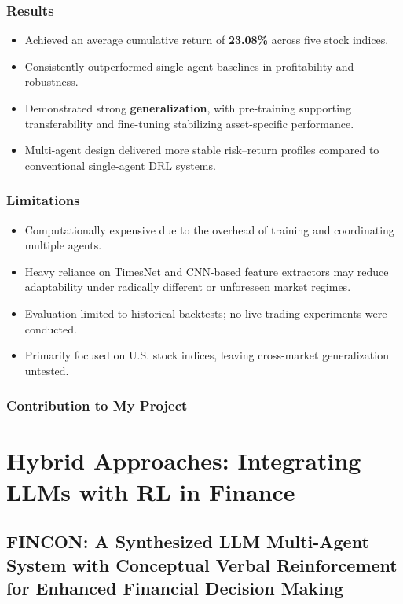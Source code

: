 \documentclass[12pt,a4paper]{report}
\begin{document}
\subsubsection{Results}
\begin{itemize}
    \item Achieved an average cumulative return of \textbf{23.08\%} across five stock indices.  
    \item Consistently outperformed single-agent baselines in profitability and robustness.  
    \item Demonstrated strong \textbf{generalization}, with pre-training supporting transferability and fine-tuning stabilizing asset-specific performance.  
    \item Multi-agent design delivered more stable risk–return profiles compared to conventional single-agent DRL systems.  
\end{itemize}

\subsubsection{Limitations}
\begin{itemize}
    \item Computationally expensive due to the overhead of training and coordinating multiple agents.  
    \item Heavy reliance on TimesNet and CNN-based feature extractors may reduce adaptability under radically different or unforeseen market regimes.  
    \item Evaluation limited to historical backtests; no live trading experiments were conducted.  
    \item Primarily focused on U.S. stock indices, leaving cross-market generalization untested.  
\end{itemize}

\subsubsection{Contribution to My Project}


\section{Hybrid Approaches: Integrating LLMs with RL in Finance}

\subsection{FINCON: A Synthesized LLM Multi-Agent System with Conceptual Verbal Reinforcement for Enhanced Financial Decision Making \cite{yu2024fincon}}
\end{document}

